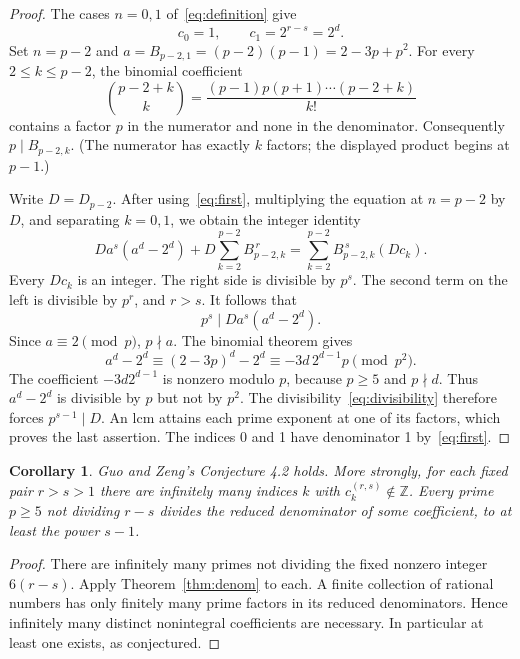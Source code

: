 \documentclass[11pt]{article}
\newtheorem{corollary}{Corollary}
\begin{document}
\begin{proof}
The cases $n=0,1$ of~\eqref{eq:definition} give
\begin{equation}\label{eq:first}
 c_0=1,\qquad c_1=2^{r-s}=2^d.
\end{equation}
Set $n=p-2$ and $a=B_{p-2,1}=(p-2)(p-1)=2-3p+p^2$.
For every $2\le k\le p-2$, the binomial coefficient
\[
 \binom{p-2+k}{k}=\frac{(p-1)p(p+1)\cdots(p-2+k)}{k!}
\]
contains a factor $p$ in the numerator and none in the denominator.
Consequently $p\mid B_{p-2,k}$. (The numerator has exactly $k$ factors;
the displayed product begins at $p-1$.)

Write $D=D_{p-2}$. After using~\eqref{eq:first}, multiplying the equation
at $n=p-2$ by $D$, and separating $k=0,1$, we obtain the integer identity
\begin{equation}\label{eq:cleared}
 D a^s(a^d-2^d)
 +D\sum_{k=2}^{p-2}B_{p-2,k}^{\,r}
 =\sum_{k=2}^{p-2}B_{p-2,k}^{\,s}(Dc_k).
\end{equation}
Every $Dc_k$ is an integer. The right side is divisible by $p^s$.
The second term on the left is divisible by $p^r$, and $r>s$.
It follows that
\begin{equation}\label{eq:divisibility}
 p^s\mid D a^s(a^d-2^d).
\end{equation}
Since $a\equiv2\pmod p$, $p\nmid a$. The binomial theorem gives
\[
 a^d-2^d\equiv(2-3p)^d-2^d
 \equiv-3d\,2^{d-1}p\pmod{p^2}.
\]
The coefficient $-3d2^{d-1}$ is nonzero modulo $p$, because $p\ge5$ and
$p\nmid d$. Thus $a^d-2^d$ is divisible by $p$ but not by $p^2$.
The divisibility~\eqref{eq:divisibility} therefore forces $p^{s-1}\mid D$.
An lcm attains each prime exponent at one of its factors, which proves
the last assertion. The indices 0 and 1 have denominator 1 by~\eqref{eq:first}.
\end{proof}

\begin{corollary}\label{cor:conjecture}
Guo and Zeng's Conjecture 4.2 holds. More strongly, for each fixed pair
$r>s>1$ there are infinitely many indices $k$ with $c_k^{(r,s)}\notin\mathbb Z$.
Every prime $p\ge5$ not dividing $r-s$ divides the reduced denominator of
some coefficient, to at least the power $s-1$.
\end{corollary}
\begin{proof}
There are infinitely many primes not dividing the fixed nonzero integer
$6(r-s)$. Apply Theorem~\ref{thm:denom} to each. A finite collection of
rational numbers has only finitely many prime factors in its reduced
denominators. Hence infinitely many distinct nonintegral coefficients
are necessary. In particular at least one exists, as conjectured.
\end{proof}
\end{document}
